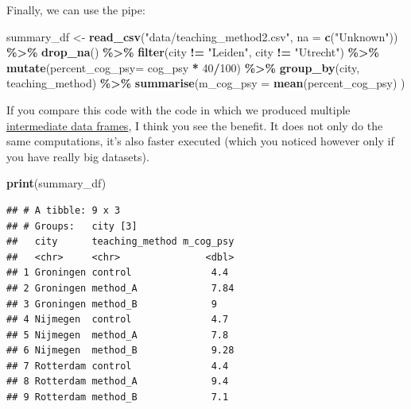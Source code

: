 \documentclass[
]{scrartcl}
\newenvironment{Shaded}{\begin{snugshade}}{\end{snugshade}}
\newcommand{\AttributeTok}[1]{\textcolor[rgb]{0.13,0.29,0.53}{#1}}
\newcommand{\DecValTok}[1]{\textcolor[rgb]{0.00,0.00,0.81}{#1}}
\newcommand{\FunctionTok}[1]{\textcolor[rgb]{0.13,0.29,0.53}{\textbf{#1}}}
\newcommand{\NormalTok}[1]{#1}
\newcommand{\OtherTok}[1]{\textcolor[rgb]{0.56,0.35,0.01}{#1}}
\newcommand{\SpecialCharTok}[1]{\textcolor[rgb]{0.81,0.36,0.00}{\textbf{#1}}}
\newcommand{\StringTok}[1]{\textcolor[rgb]{0.31,0.60,0.02}{#1}}
\begin{document}
Finally, we can use the pipe:

\begin{Shaded}
\begin{Highlighting}[]
\NormalTok{summary\_df }\OtherTok{\textless{}{-}} \FunctionTok{read\_csv}\NormalTok{(}\StringTok{"data/teaching\_method2.csv"}\NormalTok{, }\AttributeTok{na =} \FunctionTok{c}\NormalTok{(}\StringTok{"Unknown"}\NormalTok{)) }\SpecialCharTok{\%\textgreater{}\%}
        \FunctionTok{drop\_na}\NormalTok{() }\SpecialCharTok{\%\textgreater{}\%}
        \FunctionTok{filter}\NormalTok{(city }\SpecialCharTok{!=} \StringTok{"Leiden"}\NormalTok{, city }\SpecialCharTok{!=} \StringTok{"Utrecht"}\NormalTok{) }\SpecialCharTok{\%\textgreater{}\%}
        \FunctionTok{mutate}\NormalTok{(}\AttributeTok{percent\_cog\_psy=}\NormalTok{ cog\_psy }\SpecialCharTok{*} \DecValTok{40}\SpecialCharTok{/}\DecValTok{100}\NormalTok{) }\SpecialCharTok{\%\textgreater{}\%}
        \FunctionTok{group\_by}\NormalTok{(city, teaching\_method) }\SpecialCharTok{\%\textgreater{}\%}
        \FunctionTok{summarise}\NormalTok{(}\AttributeTok{m\_cog\_psy =} \FunctionTok{mean}\NormalTok{(percent\_cog\_psy) )}
\end{Highlighting}
\end{Shaded}

If you compare this code with the code in which we produced multiple \hyperref[intermediatesteps]{intermediate data frames}, I think you see the benefit. It does not only do the same computations, it's also faster executed (which you noticed however only if you have really big datasets).

\begin{Shaded}
\begin{Highlighting}[]
\FunctionTok{print}\NormalTok{(summary\_df)}
\end{Highlighting}
\end{Shaded}

\begin{verbatim}
## # A tibble: 9 x 3
## # Groups:   city [3]
##   city      teaching_method m_cog_psy
##   <chr>     <chr>               <dbl>
## 1 Groningen control              4.4 
## 2 Groningen method_A             7.84
## 3 Groningen method_B             9   
## 4 Nijmegen  control              4.7 
## 5 Nijmegen  method_A             7.8 
## 6 Nijmegen  method_B             9.28
## 7 Rotterdam control              4.4 
## 8 Rotterdam method_A             9.4 
## 9 Rotterdam method_B             7.1
\end{verbatim}
\end{document}
